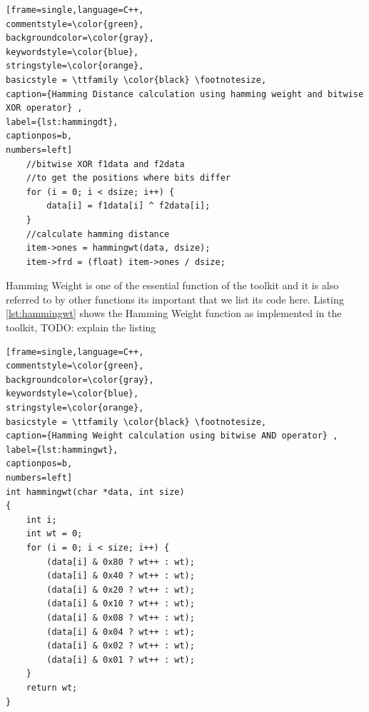 \begin{center}
\begin{minipage}{0.7\textwidth}
\begin{lstlisting}[frame=single,language=C++,
commentstyle=\color{green},
backgroundcolor=\color{gray},
keywordstyle=\color{blue},
stringstyle=\color{orange},
basicstyle = \ttfamily \color{black} \footnotesize,
caption={Hamming Distance calculation using hamming weight and bitwise XOR operator} ,
label={lst:hammingdt},
captionpos=b,
numbers=left]
    //bitwise XOR f1data and f2data
    //to get the positions where bits differ
    for (i = 0; i < dsize; i++) {
        data[i] = f1data[i] ^ f2data[i];
    }
    //calculate hamming distance
    item->ones = hammingwt(data, dsize);
    item->frd = (float) item->ones / dsize;
\end{lstlisting}
\end{minipage}
\end{center}

Hamming Weight is one of the essential function of the toolkit and it is also referred to by other functions its important that we list its code here. Listing \ref{lst:hammingwt} shows the Hamming Weight function as implemented in the toolkit,
TODO: explain the listing

\begin{center}
\begin{minipage}{0.7\textwidth}
\begin{lstlisting}[frame=single,language=C++,
commentstyle=\color{green},
backgroundcolor=\color{gray},
keywordstyle=\color{blue},
stringstyle=\color{orange},
basicstyle = \ttfamily \color{black} \footnotesize,
caption={Hamming Weight calculation using bitwise AND operator} ,
label={lst:hammingwt},
captionpos=b,
numbers=left]
int hammingwt(char *data, int size)
{
    int i;
    int wt = 0;
    for (i = 0; i < size; i++) {
        (data[i] & 0x80 ? wt++ : wt);
        (data[i] & 0x40 ? wt++ : wt);
        (data[i] & 0x20 ? wt++ : wt);
        (data[i] & 0x10 ? wt++ : wt);
        (data[i] & 0x08 ? wt++ : wt);
        (data[i] & 0x04 ? wt++ : wt);
        (data[i] & 0x02 ? wt++ : wt);
        (data[i] & 0x01 ? wt++ : wt);
    }
    return wt;
}
\end{lstlisting}
\end{minipage}
\end{center}

